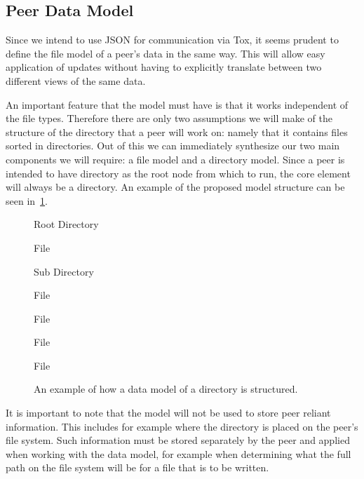 \subsection{Peer Data Model}


Since we intend to use JSON for communication via Tox, it seems prudent to define the file model of a peer's data in the same way.
This will allow easy application of updates without having to explicitly translate between two different views of the same data.

An important feature that the model must have is that it works independent of the file types.
Therefore there are only two assumptions we will make of the structure of the directory that a peer will work on: namely that it contains files sorted in directories.
Out of this we can immediately synthesize our two main components we will require: a file model and a directory model.
Since a peer is intended to have directory as the root node from which to run, the core element will always be a directory.
An example of the proposed model structure can be seen in~\ref{list:model}.

\begin{figure}[htp]
\begin{modellist}
\item Root Directory
    \begin{modellist}
        \item File
        \item Sub Directory
            \begin{modellist}
                \item File
                \item File
            \end{modellist}
        \item File
        \item File
    \end{modellist}
\end{modellist}
\caption[Data Model Example Structure]{An example of how a data model of a directory is structured.}
\label{list:model}
\end{figure}

It is important to note that the model will not be used to store peer reliant information.
This includes for example where the directory is placed on the peer's file system.
Such information must be stored separately by the peer and applied when working with the data model, for example when determining what the full path on the file system will be for a file that is to be written.

